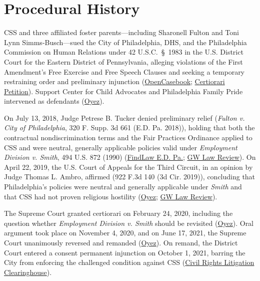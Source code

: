 \documentclass[12pt]{article}
\begin{document}
\section{Procedural History}
CSS and three affiliated foster parents---including Sharonell Fulton and Toni Lynn Simms-Busch---sued the City of Philadelphia, DHS, and the Philadelphia Commission on Human Relations under 42 U.S.C.~\S~1983 in the U.S. District Court for the Eastern District of Pennsylvania, alleging violations of the First Amendment's Free Exercise and Free Speech Clauses and seeking a temporary restraining order and preliminary injunction (\href{https://opencasebook.org/casebooks/4501-constitutional-law/resources/12.9-fulton-v-city-of-philadelphia-2020/}{OpenCasebook}; \href{https://www.supremecourt.gov/DocketPDF/19/19-123/108931/20190722174037071_Cert\%20Petition\%20FINAL.pdf}{Certiorari Petition}). Support Center for Child Advocates and Philadelphia Family Pride intervened as defendants (\href{https://www.oyez.org/cases/2020/19-123}{Oyez}).

On July 13, 2018, Judge Petrese B. Tucker denied preliminary relief (\textit{Fulton v. City of Philadelphia}, 320 F. Supp. 3d 661 (E.D. Pa. 2018)), holding that both the contractual nondiscrimination terms and the Fair Practices Ordinance applied to CSS and were neutral, generally applicable policies valid under \textit{Employment Division v. Smith}, 494 U.S. 872 (1990) (\href{https://caselaw.findlaw.com/court/us-dis-crt-ed-pen/1943877.html}{FindLaw E.D. Pa.}; \href{https://www.gwlr.org/two-surprises-in-fulton-v-city-of-philadelphia/}{GW Law Review}). On April 22, 2019, the U.S. Court of Appeals for the Third Circuit, in an opinion by Judge Thomas L. Ambro, affirmed (922 F.3d 140 (3d Cir. 2019)), concluding that Philadelphia's policies were neutral and generally applicable under \textit{Smith} and that CSS had not proven religious hostility (\href{https://www.oyez.org/cases/2020/19-123}{Oyez}; \href{https://www.gwlr.org/two-surprises-in-fulton-v-city-of-philadelphia/}{GW Law Review}).

The Supreme Court granted certiorari on February 24, 2020, including the question whether \textit{Employment Division v. Smith} should be revisited (\href{https://www.oyez.org/cases/2020/19-123}{Oyez}). Oral argument took place on November 4, 2020, and on June 17, 2021, the Supreme Court unanimously reversed and remanded (\href{https://www.oyez.org/cases/2020/19-123}{Oyez}). On remand, the District Court entered a consent permanent injunction on October 1, 2021, barring the City from enforcing the challenged condition against CSS (\href{https://clearinghouse.net/case/17588/}{Civil Rights Litigation Clearinghouse}).
\end{document}
